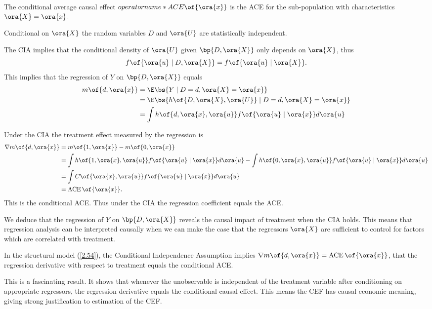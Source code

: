 The conditional average causal effect $operatorname*{ACE}\of{\ora{x}}$ is the ACE for the sub-population with characteristics $\ora{X} = \ora{x}$.

\begin{definition}
    Conditional on $\ora{X}$ the random variables $D$ and $\ora{U}$ are statistically independent.
\end{definition}

The CIA implies that the conditional density of $\ora{U}$ given $\bp{D, \ora{X}}$ only depends on $\ora{X}$, thus $$f\of{\ora{u} \mid D, \ora{X}} = f\of{\ora{u} \mid \ora{X}}.$$ This implies that the regression of $Y$ on $\bp{D, \ora{X}}$ equals
\begin{equation}
    \notag
    \begin{aligned}
        m\of{d, \ora{x}} & = \E\bs{Y \mid D = d, \ora{X} = \ora{x}} \\ 
        & = \E\bs{h\of{D, \ora{X}, \ora{U}} \mid D = d, \ora{X} = \ora{x}} \\
        & = \int h\of{d, \ora{x}, \ora{u}} f\of{\ora{u} \mid \ora{x}} d\ora{u}
    \end{aligned}
\end{equation}

Under the CIA the treatment effect measured by the regression is
\begin{equation}
    \label{2.55}
    \begin{aligned}
        \nabla m\of{d, \ora{x}} & = m\of{1, \ora{x}} - m\of{0, \ora{x}} \\
        & = \int h\of{1, \ora{x}, \ora{u}} f\of{\ora{u} \mid \ora{x}} d\ora{u} - \int h\of{0, \ora{x}, \ora{u}} f\of{\ora{u} \mid \ora{x}} d\ora{u} \\
        & = \int C\of{\ora{x}, \ora{u}} f\of{\ora{u} \mid \ora{x}} d\ora{u} \\
        & = \operatorname*{ACE}\of{\ora{x}}.
    \end{aligned}
\end{equation}
This is the conditional ACE. Thus under the CIA the regression coefficient equals the ACE.

We deduce that the regression of $Y$ on $\bp{D, \ora{X}}$ reveals the causal impact of treatment when the CIA holds. This means that regression analysis can be interpreted causally when we can make the case that the regressors $\ora{X}$ are sufficient to control for factors which are correlated with treatment.

\begin{theorem}
    In the structural model (\ref{2.54}), the Conditional Independence Assumption implies $\nabla m\of{d, \ora{x}} = \operatorname*{ACE}\of{\ora{x}}$, that the regression derivative with respect to treatment equals the conditional ACE.
\end{theorem}

This is a fascinating result. It shows that whenever the unobservable is independent of the treatment variable after conditioning on appropriate regressors, the regression derivative equals the conditional causal effect. This means the CEF has causal economic meaning, giving strong justification to estimation of the CEF.

